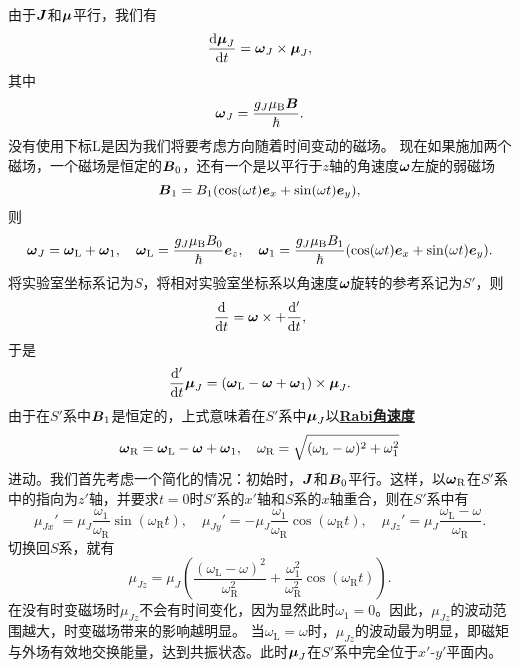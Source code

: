 \documentclass[UTF8, a4paper]{ctexart}
\newcommand*{\concept}[1]{\underline{\textbf{#1}}}
\begin{document}
由于$\vb*{J}$和$\vb*{\mu}$平行，我们有
\[
    \dv{\vb*{\mu}_J}{t} = \vb*{\omega}_J \times \vb*{\mu}_J,
\]
其中
\[
    \vb*{\omega}_J = \frac{g_J \mu_\text{B} \vb*{B}}{\hbar}.
\]
没有使用下标L是因为我们将要考虑方向随着时间变动的磁场。
现在如果施加两个磁场，一个磁场是恒定的$\vb*{B}_0$，还有一个是以平行于$z$轴的角速度$\vb*{\omega}$左旋的弱磁场
\begin{equation}
    \vb*{B}_1 = B_1 (\cos(\omega t) \vb*{e}_x + \sin(\omega t) \vb*{e}_y),
\end{equation}
则
\begin{equation}
    \vb*{\omega}_J = \vb*{\omega}_\text{L} + \vb*{\omega}_{1}, \quad \vb*{\omega}_\text{L} = \frac{g_J \mu_\text{B} B_0}{\hbar} \vb*{e}_z, \quad \vb*{\omega}_1 = \frac{g_J \mu_\text{B} B_1}{\hbar} (\cos(\omega t) \vb*{e}_x + \sin (\omega t) \vb*{e}_y).
\end{equation}
将实验室坐标系记为$S$，将相对实验室坐标系以角速度$\vb*{\omega}$旋转的参考系记为$S'$，则
\[
    \dv{t} = \vb*{\omega} \times + \dv'{t},
\]
于是
\[
    \dv'{t} \vb*{\mu}_J = (\vb*{\omega}_\text{L} - \vb*{\omega} + \vb*{\omega}_1) \times \vb*{\mu}_J.
\]
由于在$S'$系中$\vb*{B}_1$是恒定的，上式意味着在$S'$系中$\vb*{\mu}_J$以\concept{Rabi角速度}
\begin{equation}
    \vb*{\omega}_\text{R} = \vb*{\omega}_\text{L} - \vb*{\omega} + \vb*{\omega}_1, \quad \omega_\text{R} = \sqrt{(\omega_\text{L} - \omega)^2 + \omega_1^2}
\end{equation}
进动。我们首先考虑一个简化的情况：初始时，$\vb*{J}$和$\vb*{B}_0$平行。这样，以$\vb*{\omega}_\text{R}$在$S'$系中的指向为$z'$轴，并要求$t=0$时$S'$系的$x'$轴和$S$系的$x$轴重合，则在$S'$系中有
\begin{equation}
    \mu_{Jx}' = \mu_J \frac{\omega_1}{\omega_\text{R}} \sin (\omega_\text{R} t), \quad \mu_{Jy}' = - \mu_J \frac{\omega_1}{\omega_\text{R}} \cos (\omega_\text{R} t), \quad \mu_{Jz}' = \mu_J \frac{\omega_\text{L} - \omega}{\omega_\text{R}}.
\end{equation}
切换回$S$系，就有
\begin{equation}
    \mu_{Jz} = \mu_J \left( \frac{(\omega_\text{L} - \omega)^2}{\omega_\text{R}^2} + \frac{\omega_1^2}{\omega_\text{R}^2} \cos (\omega_\text{R} t) \right).
\end{equation}
在没有时变磁场时$\mu_{Jz}$不会有时间变化，因为显然此时$\omega_1=0$。因此，$\mu_{Jz}$的波动范围越大，时变磁场带来的影响越明显。
当$\omega_\text{L}=\omega$时，$\mu_{Jz}$的波动最为明显，即磁矩与外场有效地交换能量，达到共振状态。此时$\vb*{\mu}_J$在$S'$系中完全位于$x'$-$y'$平面内。
\end{document}
